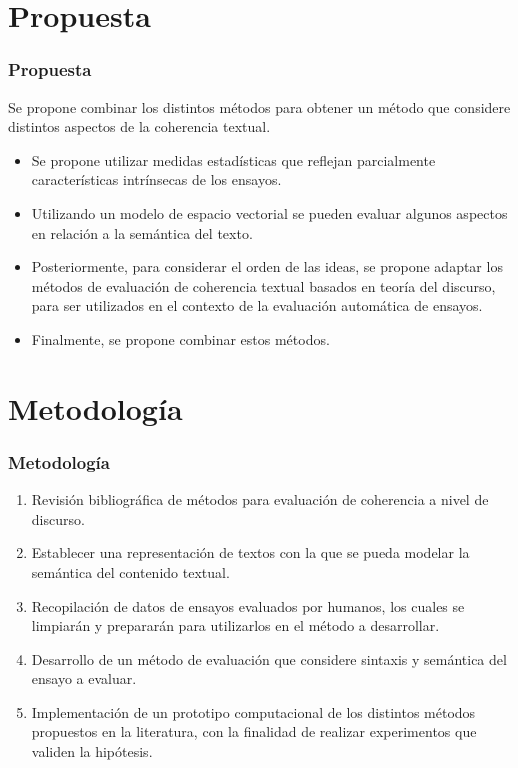 \documentclass{beamer}
\begin{document}
\section{Propuesta}
\begin{frame}
\frametitle{Propuesta}
Se propone combinar los distintos métodos para obtener un método que considere distintos aspectos de la coherencia textual.

\begin{itemize}
\item Se propone utilizar medidas estadísticas que reflejan parcialmente características intrínsecas de los ensayos.
\item Utilizando un modelo de espacio vectorial se pueden evaluar algunos aspectos en relación a la semántica del texto.
\item Posteriormente, para considerar el orden de las ideas, se propone adaptar los métodos de evaluación de coherencia textual basados en teoría del discurso, para ser utilizados en el contexto de la evaluación automática de ensayos.
\item Finalmente, se propone combinar estos métodos.

\end{itemize}

\end{frame}

\section{Metodología}
\begin{frame}
\frametitle{Metodología}
\begin{enumerate}
	\item Revisión bibliográfica de métodos para evaluación de coherencia a nivel de discurso.
	
	\item Establecer una representación de textos con la que se pueda modelar la semántica del contenido textual.
	
	\item Recopilación de datos de ensayos evaluados por humanos, los cuales se limpiarán y prepararán para utilizarlos en el método a desarrollar.
	
	\item Desarrollo de un método de evaluación que considere sintaxis y semántica del ensayo a evaluar.
	
	\item Implementación de un prototipo computacional de los distintos métodos propuestos en la literatura, con la finalidad de realizar experimentos que validen la hipótesis.
	
	\end{enumerate}
\end{frame}
\end{document}
